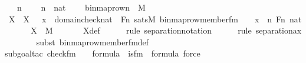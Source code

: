 \begin{isabellebody}
\ \ \ n\ \isanewline
\ \ \ {\isachardoublequoteopen}n\ {\isasymin}\ nat{\isachardoublequoteclose}\ \isanewline
\ \ \ {\isachardoublequoteopen}binmap{\isacharunderscore}{\kern0pt}row{\isacharprime}{\kern0pt}{\isacharparenleft}{\kern0pt}n{\isacharparenright}{\kern0pt}\ {\isasymin}\ M{\isachardoublequoteclose}\ \isanewline
%
\isadelimproof
%
\endisadelimproof
%
\isatagproof
{}\isamarkupfalse%
\ {\isacharminus}{\kern0pt}\ \isanewline
\ \ \isamarkupfalse%
\ X\ \ {\isachardoublequoteopen}X\ {\isasymequiv}\ {\isacharbraceleft}{\kern0pt}\ x\ {\isasymin}\ domain{\isacharparenleft}{\kern0pt}check{\isacharparenleft}{\kern0pt}nat{\isacharparenright}{\kern0pt}{\isacharparenright}{\kern0pt}\ {\isasymtimes}\ Fn{\isachardot}{\kern0pt}\ sats{\isacharparenleft}{\kern0pt}M{\isacharcomma}{\kern0pt}\ binmap{\isacharunderscore}{\kern0pt}row{\isacharprime}{\kern0pt}{\isacharunderscore}{\kern0pt}member{\isacharunderscore}{\kern0pt}fm{\isacharparenleft}{\kern0pt}{}{\isacharcomma}{\kern0pt}\ {}{\isacharcomma}{\kern0pt}\ {}{\isacharcomma}{\kern0pt}\ {}{\isacharparenright}{\kern0pt}{\isacharcomma}{\kern0pt}\ {\isacharbrackleft}{\kern0pt}x{\isacharbrackright}{\kern0pt}\ {\isacharat}{\kern0pt}\ {\isacharbrackleft}{\kern0pt}n{\isacharcomma}{\kern0pt}\ Fn{\isacharcomma}{\kern0pt}\ nat{\isacharbrackright}{\kern0pt}{\isacharparenright}{\kern0pt}\ {\isacharbraceright}{\kern0pt}{\isachardoublequoteclose}\ \isanewline
\isanewline
\ \ \isamarkupfalse%
\ {\isachardoublequoteopen}X\ {\isasymin}\ M{\isachardoublequoteclose}\ \isanewline
\ \ \ \ \isamarkupfalse%
\ X{\isacharunderscore}{\kern0pt}def\ \isanewline
\ \ \ \ \isamarkupfalse%
{\isacharparenleft}{\kern0pt}rule\ separation{\isacharunderscore}{\kern0pt}notation{\isacharparenright}{\kern0pt}\isanewline
\ \ \ \ \ \isamarkupfalse%
{\isacharparenleft}{\kern0pt}rule\ separation{\isacharunderscore}{\kern0pt}ax{\isacharparenright}{\kern0pt}\isanewline
\ \ \ \ \ \ \ \isamarkupfalse%
{\isacharparenleft}{\kern0pt}subst\ binmap{\isacharunderscore}{\kern0pt}row{\isacharprime}{\kern0pt}{\isacharunderscore}{\kern0pt}member{\isacharunderscore}{\kern0pt}fm{\isacharunderscore}{\kern0pt}def{\isacharparenright}{\kern0pt}\isanewline
\ \ \ \ \ \ \ \isamarkupfalse%
{\isacharparenleft}{\kern0pt}subgoal{\isacharunderscore}{\kern0pt}tac\ {\isachardoublequoteopen}check{\isacharunderscore}{\kern0pt}fm{\isacharparenleft}{\kern0pt}{}{\isacharcomma}{\kern0pt}\ {}{\isacharcomma}{\kern0pt}\ {}{\isacharparenright}{\kern0pt}\ {\isasymin}\ formula\ {\isasymand}\ is{\isacharunderscore}{\kern0pt}{}{\isacharunderscore}{\kern0pt}fm{\isacharparenleft}{\kern0pt}{}{\isacharparenright}{\kern0pt}\ {\isasymin}\ formula{\isachardoublequoteclose}{\isacharcomma}{\kern0pt}\ force{\isacharparenright}{\kern0pt}\isanewline

\end{isabellebody}
